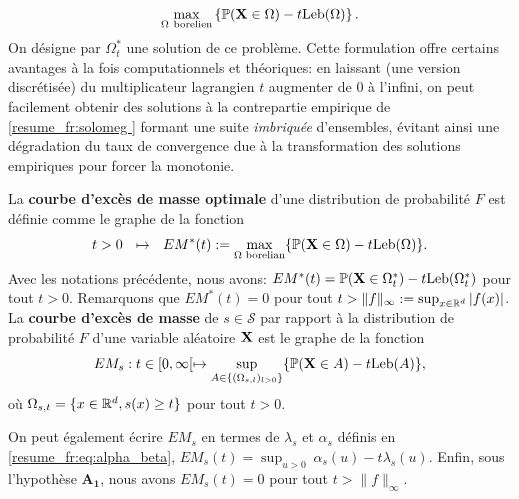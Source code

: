 \begin{equation}
\label{resume_fr:solomeg}
\max_{\Omega~ \text{borelien}}  \left\{ \mathbb{P}(\mathbf X \in \Omega) - t \text{Leb}(\Omega) \right\}.
\end{equation}
On désigne par $ \Omega ^ * _ t $ une solution de ce problème. Cette formulation offre certains avantages à la fois computationnels et théoriques: en laissant (une version discrétisée) du multiplicateur lagrangien $ t $ augmenter de $ 0 $ à l'infini, on peut facilement obtenir des solutions à la contrepartie empirique de \eqref{resume_fr:solomeg } formant une suite \textit {imbriquée} d'ensembles, évitant ainsi une dégradation du taux de convergence due à la transformation des solutions empiriques pour forcer la monotonie.

%
La \textbf{courbe d'excès de masse optimale} d'une distribution de probabilité  $F$ est définie comme le graphe de la fonction
$$t>0~~\mapsto~~ EM^*(t):=\max_{\Omega\text{ borelian} } \{ {\mathbb{P}} (\mathbf X\in \Omega)-t\text{Leb}(\Omega) \}.$$ 
Avec les notations précédente, nous avons: $EM^*(t)=\mathbb{P}(\mathbf X \in \Omega_t^*)-t \text{Leb}(\Omega_t^*)$ pour tout $t>0$.
Remarquons que $EM^*(t) = 0$ pour tout $t>\|f\|_\infty:=\sup_{x\in \mathbb{R}^d}\vert f(x)\vert$. 
%
  La \textbf{courbe d'excès de masse} de $s\in\mathcal{S}$ par rapport à la distribution de probabilité $F$ d'une variable aléatoire $\mathbf X$ est le graphe de la fonction
\begin{equation}
\label{resume_fr:EM}
EM_s : t \in [0, \infty[ \mapsto \sup_{A \in \{(\Omega_{s,l})_{l>0}\}}\{ {\mathbb{P}}(\mathbf X \in A) - t \text{Leb}(A)\},
\end{equation}
où $\Omega_{s,t}=\{ x \in \mathbb{R}^d, s(x) \ge t \}$ pour tout $t>0$.

On peut également écrire $ EM_s $ en termes de $ \lambda_s $ et $ \alpha_s $ définis en \eqref{resume_fr:eq:alpha_beta}, $EM_s(t)= \sup_{u>0}~ \alpha_s(u) -t \lambda_s(u) $. Enfin, sous l'hypothèse $ \mathbf {A_1} $, nous avons $ EM_s (t) = 0 $ pour tout $t> \|f\|_\infty$.


